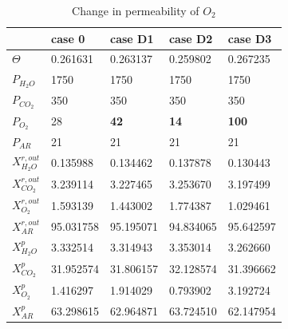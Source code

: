 \begin{table}[H]
\centering
\caption{Change in permeability of $O_2$}
\label{tab:table5}
\begin{tabular}{|l|l|l|l|l|}
\hline
                    & case 0        & case D1       & case D2       & case D3  \\ \hline
$\Theta$            & 0.261631      & 0.263137      & 0.259802      & 0.267235 \\ \hline
$P_{H_2O}$          & 1750          & 1750          & 1750          & 1750     \\ \hline
$P_{CO_2}$          & 350           & 350           & 350           & 350      \\ \hline
$P_{O_2}$           & 28            & \textbf{42}   & \textbf{14}   & \textbf{100} \\ \hline
$P_{AR}$            & 21            & 21            & 21        & 21        \\ \hline \hline
$X^{r,out}_{H_2O}$  & 0.135988      & 0.134462      & 0.137878  & 0.130443  \\ \hline
$X^{r,out}_{CO_2}$  & 3.239114      & 3.227465      & 3.253670  & 3.197499  \\ \hline
$X^{r,out}_{O_2}$   & 1.593139      & 1.443002      & 1.774387  & 1.029461  \\ \hline
$X^{r,out}_{AR}$    & 95.031758     & 95.195071     & 94.834065 & 95.642597 \\ \hline
$X^{p}_{H_2O}$      & 3.332514      & 3.314943      & 3.353014  & 3.262660  \\ \hline
$X^{p}_{CO_2}$      & 31.952574     & 31.806157     & 32.128574 & 31.396662 \\ \hline
$X^{p}_{O_2}$       & 1.416297      & 1.914029      & 0.793902  & 3.192724  \\ \hline
$X^{p}_{AR}$        & 63.298615     & 62.964871     & 63.724510 &  62.147954\\ \hline
\end{tabular}
\end{table}


